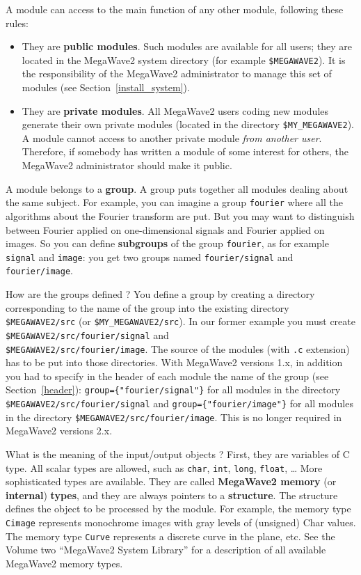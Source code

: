 A module can access to the main function of any other module, following these rules:
\begin{itemize}
\item They are {\bf public modules}. Such modules are available for all users; they are located in the MegaWave2 system directory (for example \verb+$MEGAWAVE2+). 
It is the responsibility of the MegaWave2 administrator to manage this set of modules (see Section~\ref{install_system}).
\item They are {\bf private modules}. 
All MegaWave2 users coding new modules generate their own private modules (located in the directory \verb+$MY_MEGAWAVE2+).
A module cannot access to another private module {\em from another user}.
Therefore, if somebody has written a module of some interest for others, the MegaWave2 administrator should make it public.
\end{itemize}

A module belongs to a {\bf group}.
A group puts together all modules dealing about the same subject.
For example, you can imagine a group \verb+fourier+ where all the algorithms about the Fourier transform are put.
But you may want to distinguish between Fourier applied on one-dimensional signals and Fourier applied on images.
So you can define {\bf subgroups} of the group \verb+fourier+, as for example \verb+signal+ and \verb+image+: you get two groups named \verb+fourier/signal+ and \verb+fourier/image+.

How are the groups defined ? You define a group by creating a directory corresponding to the name of the group
into the existing directory \verb+$MEGAWAVE2/src+ (or \verb+$MY_MEGAWAVE2/src+).
In our former example you must create \verb+$MEGAWAVE2/src/fourier/signal+ and  
\\ \verb+$MEGAWAVE2/src/fourier/image+.
The source of the modules (with \verb+.c+ extension) has to be put into those directories.
With MegaWave2 versions 1.x, in addition you had to specify in the header of each module the name 
of the group (see Section~\ref{header}): \verb+group={"fourier/signal"}+ for all modules in the directory \verb+$MEGAWAVE2/src/fourier/signal+ and  \verb+group={"fourier/image"}+ for all modules in 
the directory \verb+$MEGAWAVE2/src/fourier/image+.
This is no longer required in MegaWave2 versions 2.x. 

What is the meaning of the input/output objects ? 
First, they are variables of C type. 
All scalar types are allowed, such as \verb+char+, \verb+int+, \verb+long+, \verb+float+, \ldots
More sophisticated types are available. 
They are called {\bf MegaWave2 memory} (or 
{\bf internal}) {\bf types}, 
and they are always pointers to a {\bf structure}.
The structure defines the object to be processed by the module.
For example, the memory type \verb+Cimage+ represents monochrome images with gray levels of (unsigned) Char values.
The memory type \verb+Curve+ represents a discrete curve in the plane, etc.
See the Volume two ``MegaWave2 System Library'' for a description of all available MegaWave2 memory types.

